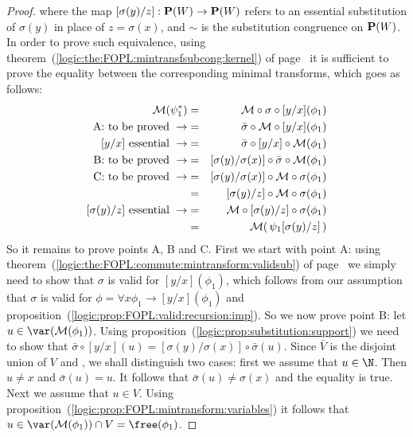 \begin{proof}
where the map $[\sigma(y)/z]:{\bf P}(W)\to{\bf P}(W)$ refers to an
essential substitution of $\sigma(y)$ in place of $z=\sigma(x)$, and
$\sim$ is the substitution congruence on ${\bf P}(W)$. In order to
prove such equivalence, using
theorem~(\ref{logic:the:FOPL:mintransfsubcong:kernel}) of
page~\pageref{logic:the:FOPL:mintransfsubcong:kernel} it is
sufficient to prove the equality between the corresponding minimal
transforms, which goes as follows:
    \begin{eqnarray*}
    {\cal M}(\psi_{1}^{*})&=&{\cal
    M}\circ\sigma\circ[y/x](\phi_{1})\\
    \mbox{A: to be proved}\ \rightarrow
    &=&\bar{\sigma}\circ{\cal M}\circ[y/x](\phi_{1})\\
    \mbox{$[y/x]$ essential}\ \rightarrow
    &=&\bar{\sigma}\circ[y/x]\circ{\cal M}(\phi_{1})\\
    \mbox{B: to be proved}\ \rightarrow
    &=&[\sigma(y)/\sigma(x)]\circ\bar{\sigma}\circ{\cal M}(\phi_{1})\\
    \mbox{C: to be proved}\ \rightarrow
    &=&[\sigma(y)/\sigma(x)]\circ{\cal M}\circ\sigma(\phi_{1})\\
    &=&[\sigma(y)/z]\circ{\cal M}\circ\sigma(\phi_{1})\\
    \mbox{$[\sigma(y)/z]$ essential}\ \rightarrow
    &=&{\cal M}\circ[\sigma(y)/z]\circ\sigma(\phi_{1})\\
    &=&{\cal M}(\,\psi_{1}[\sigma(y)/z]\,)\\
    \end{eqnarray*}
So it remains to prove points A, B and C. First we start with point
A: using
theorem~(\ref{logic:the:FOPL:commute:mintransform:validsub}) of
page~\pageref{logic:the:FOPL:commute:mintransform:validsub} we
simply need to show that $\sigma$ is valid for $[y/x](\phi_{1})$,
which follows from our assumption that $\sigma$ is valid for
$\phi=\forall x\phi_{1}\to[y/x](\phi_{1})$ and
proposition~(\ref{logic:prop:FOPL:valid:recursion:imp}). So we now
prove point B: let $u\in\var({\cal M}(\phi_{1}))$. Using
proposition~(\ref{logic:prop:substitution:support}) we need to show
that
$\bar{\sigma}\circ[y/x](u)=[\sigma(y)/\sigma(x)]\circ\bar{\sigma}(u)$.
Since $\bar{V}$ is the disjoint union of $V$ and \N, we shall
distinguish two cases: first we assume that $u\in\N$. Then $u\neq x$
and $\bar{\sigma}(u)=u$. It follows that
$\bar{\sigma}(u)\neq\sigma(x)$ and the equality is true. Next we
assume that $u\in V$. Using
proposition~(\ref{logic:prop:FOPL:mintransform:variables}) it
follows that $u\in\var({\cal M}(\phi_{1}))\cap V=\free(\phi_{1})$.

\end{proof}
